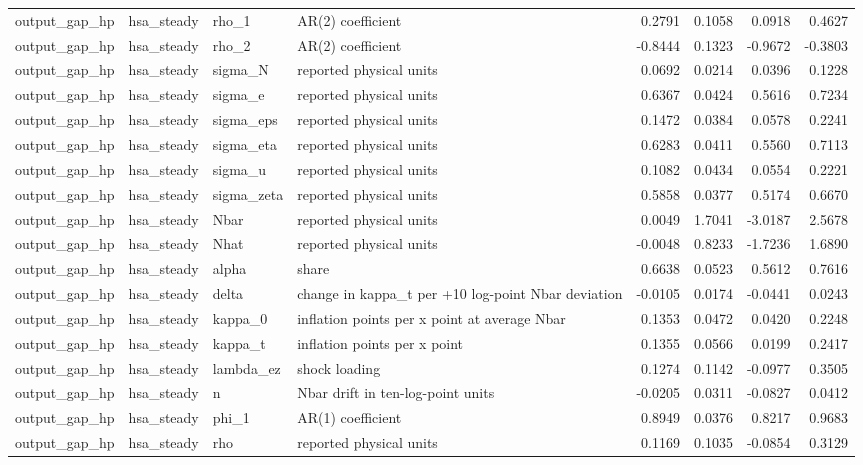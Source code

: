 \begin{tabular}{llllrrrr}
output\_gap\_hp & hsa\_steady & rho\_1 & AR(2) coefficient & 0.2791 & 0.1058 & 0.0918 & 0.4627 \\
output\_gap\_hp & hsa\_steady & rho\_2 & AR(2) coefficient & -0.8444 & 0.1323 & -0.9672 & -0.3803 \\
output\_gap\_hp & hsa\_steady & sigma\_N & reported physical units & 0.0692 & 0.0214 & 0.0396 & 0.1228 \\
output\_gap\_hp & hsa\_steady & sigma\_e & reported physical units & 0.6367 & 0.0424 & 0.5616 & 0.7234 \\
output\_gap\_hp & hsa\_steady & sigma\_eps & reported physical units & 0.1472 & 0.0384 & 0.0578 & 0.2241 \\
output\_gap\_hp & hsa\_steady & sigma\_eta & reported physical units & 0.6283 & 0.0411 & 0.5560 & 0.7113 \\
output\_gap\_hp & hsa\_steady & sigma\_u & reported physical units & 0.1082 & 0.0434 & 0.0554 & 0.2221 \\
output\_gap\_hp & hsa\_steady & sigma\_zeta & reported physical units & 0.5858 & 0.0377 & 0.5174 & 0.6670 \\
output\_gap\_hp & hsa\_steady & Nbar & reported physical units & 0.0049 & 1.7041 & -3.0187 & 2.5678 \\
output\_gap\_hp & hsa\_steady & Nhat & reported physical units & -0.0048 & 0.8233 & -1.7236 & 1.6890 \\
output\_gap\_hp & hsa\_steady & alpha & share & 0.6638 & 0.0523 & 0.5612 & 0.7616 \\
output\_gap\_hp & hsa\_steady & delta & change in kappa\_t per +10 log-point Nbar deviation & -0.0105 & 0.0174 & -0.0441 & 0.0243 \\
output\_gap\_hp & hsa\_steady & kappa\_0 & inflation points per x point at average Nbar & 0.1353 & 0.0472 & 0.0420 & 0.2248 \\
output\_gap\_hp & hsa\_steady & kappa\_t & inflation points per x point & 0.1355 & 0.0566 & 0.0199 & 0.2417 \\
output\_gap\_hp & hsa\_steady & lambda\_ez & shock loading & 0.1274 & 0.1142 & -0.0977 & 0.3505 \\
output\_gap\_hp & hsa\_steady & n & Nbar drift in ten-log-point units & -0.0205 & 0.0311 & -0.0827 & 0.0412 \\
output\_gap\_hp & hsa\_steady & phi\_1 & AR(1) coefficient & 0.8949 & 0.0376 & 0.8217 & 0.9683 \\
output\_gap\_hp & hsa\_steady & rho & reported physical units & 0.1169 & 0.1035 & -0.0854 & 0.3129 \\

\end{tabular}
